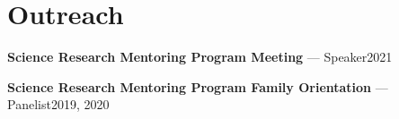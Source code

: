 \section{Outreach}

\begin{compact}
\noindent\textbf{Science Research Mentoring Program Meeting} --- Speaker\hfill 2021\par
\noindent\textbf{Science Research Mentoring Program Family Orientation} --- Panelist\hfill 2019, 2020\par
\end{compact}
